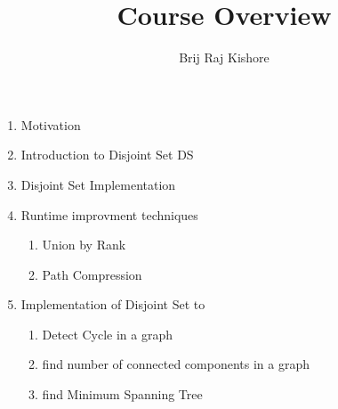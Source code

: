 \documentclass[12pt,twocolumn]{article}
\title{Course Overview}
\date{}
\author{Brij Raj Kishore}
\begin{document}
	\maketitle
		\begin{enumerate}
			\item Motivation
			\item Introduction to Disjoint Set DS
			\item Disjoint Set Implementation
			\item Runtime improvment techniques
			\begin{enumerate}
				\item Union by Rank
				\item Path Compression
			\end{enumerate}
			\item Implementation of Disjoint Set to
			\begin{enumerate}
				\item Detect Cycle in a graph
				\item find number of connected components in a graph
				\item find Minimum Spanning Tree
			\end{enumerate}
			
		\end{enumerate}
\end{document}
